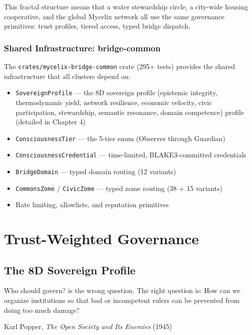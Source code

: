 \documentclass[12pt]{book}
\begin{document}
This fractal structure means that a water stewardship circle, a city-wide
housing cooperative, and the global Mycelix network all use the same governance
primitives: trust profiles, tiered access, typed bridge dispatch.

\section{Shared Infrastructure: bridge-common}

The \texttt{crates/mycelix-bridge-common} crate (295+ tests) provides the shared
infrastructure that all clusters depend on:

\begin{itemize}
  \item \texttt{SovereignProfile} --- the 8D sovereign profile (epistemic integrity, thermodynamic yield, network resilience, economic velocity, civic participation, stewardship, semantic resonance, domain competence)
    profile (detailed in Chapter 4)
  \item \texttt{ConsciousnessTier} --- the 5-tier enum (Observer through Guardian)
  \item \texttt{ConsciousnessCredential} --- time-limited, BLAKE3-committed credentials
  \item \texttt{BridgeDomain} --- typed domain routing (12 variants)
  \item \texttt{CommonsZome} / \texttt{CivicZome} --- typed zome routing (38 + 15 variants)
  \item Rate limiting, allowlists, and reputation primitives
\end{itemize}



\part{Trust-Weighted Governance}

\chapter{The 8D Sovereign Profile}
\label{ch:trust-profile}

\epigraph{Who should govern? is the wrong question. The right question is:
How can we organize institutions so that bad or incompetent rulers can be
prevented from doing too much damage?}{Karl Popper, \textit{The Open Society
and Its Enemies} (1945)}
\end{document}
